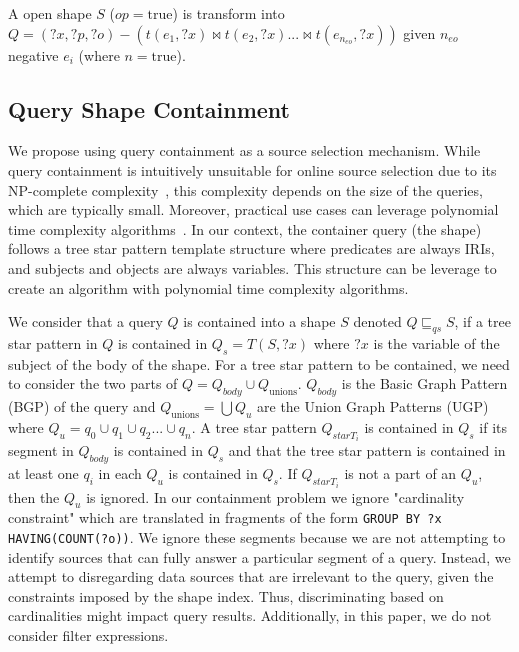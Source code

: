 \begin{prop}
   A open shape $S$ ($op = \mathrm{true}$) is transform into $Q = (?x, ?p, ?o) -  (t(e_1, ?x) \bowtie  t(e_2, ?x) ... \bowtie t(e_{n_{eo}}, ?x)) $
   given $n_{eo}$ negative $e_i$ (where $n = \mathrm{true}$).
\end{prop}

\subsection{Query Shape Containment}\label{sec:containment}

We propose using query containment as a source selection mechanism.
While query containment is intuitively unsuitable for online source selection due to its NP-complete complexity~\cite{Spasi2023}, this complexity depends on the size of the queries, which are typically small.
Moreover, practical use cases can leverage polynomial time complexity algorithms~\cite{Doan2012}.
In our context, the container query (the shape) follows a tree star pattern template structure where predicates are always IRIs, and subjects and objects are always variables.
This structure can be leverage to create an algorithm with polynomial time complexity algorithms.

We consider that a query $Q$ is contained into a shape $S$ denoted $Q \sqsubseteq_{qs} S$, if a tree star pattern in $Q$ is contained in $Q_s = T(S, ?x)$ where $?x$ is the variable of the subject of the body of the shape.
For a tree star pattern to be contained, we need to consider the two parts of $Q = Q_{body} \cup Q_{\text{unions}}$.
$Q_{body}$ is the Basic Graph Pattern (BGP) of the query and $Q_{\text{unions}} = \bigcup Q_u$ are the Union Graph Patterns (UGP) where $Q_u = q_0 \cup q_1 \cup q_2 ... \cup q_n$.
A tree star pattern $Q_{starT_i}$ is contained in $Q_s$ if its segment in $Q_{body}$ is contained in $Q_s$ and that the tree star pattern is contained in at least one $q_i$ in each $Q_u$ is contained in $Q_s$.
If $Q_{starT_i}$ is not a part of an $Q_u$, then the $Q_u$ is ignored.
In our containment problem we ignore "cardinality constraint" which are translated in 
fragments of the form \texttt{GROUP BY ?x HAVING(COUNT(?o))}.
We ignore these segments because we are not attempting to identify sources that can fully answer a particular segment of a query.
Instead, we attempt to disregarding data sources that are irrelevant to the query, given the constraints imposed by the shape index.
Thus, discriminating based on cardinalities might impact query results.
Additionally, in this paper, we do not consider filter expressions.

